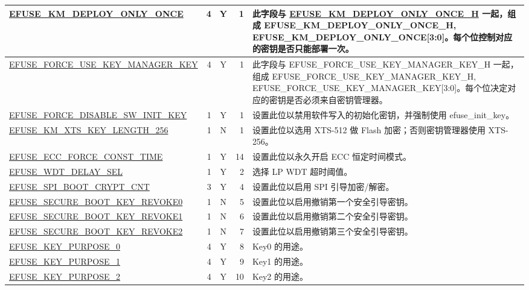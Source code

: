 \begin{longtable}[l]{ |m{8.2cm}|r|c|r|m{9cm}| }
    \hyperref[fielddesc:EFUSEKMDEPLOYONLYONCE]{EFUSE\_KM\_DEPLOY\_ONLY\_ONCE} & 4 & Y & 1 & 此字段与 \hyperref[fielddesc:EFUSEKMDEPLOYONLYONCEH]{EFUSE\_KM\_DEPLOY\_ONLY\_ONCE\_H} 一起，组成 {EFUSE\_\-KM\_\-DEPLOY\_\-ONLY\_\-ONCE\_\-H, EFUSE\_\-KM\_\-DEPLOY\_\-ONLY\_\-ONCE[3:0]}。每个位控制对应的密钥是否只能部署一次。\\ \hline
    \hyperref[fielddesc:EFUSEFORCEUSEKEYMANAGERKEY]{EFUSE\_FORCE\_USE\_KEY\_MANAGER\_KEY} & 4 & Y & 1 & 此字段与 EFUSE\_FORCE\_USE\_KEY\_MANAGER\_KEY\_H 一起，组成 {EFUSE\_\-FORCE\_\-USE\_\-KEY\_\-MANAGER\_\-KEY\_\-H, EFUSE\_\-FORCE\_\-USE\_\-KEY\_\-MANAGER\_\-KEY[3:0]}。每个位决定对应的密钥是否必须来自密钥管理器。 \\ \hline
    \hyperref[fielddesc:EFUSEFORCEDISABLESWINITKEY]{EFUSE\_FORCE\_DISABLE\_SW\_INIT\_KEY} & 1 & Y & 1 & 设置此位以禁用软件写入的初始化密钥，并强制使用 efuse\_init\_key。 \\ \hline
    \hyperref[fielddesc:EFUSEKMXTSKEYLENGTH256]{EFUSE\_KM\_XTS\_KEY\_LENGTH\_256} & 1 & N & 1 & 设置此位以选用 XTS-512 做 Flash 加密；否则密钥管理器使用 XTS-256。 \\ \hline
    \hyperref[fielddesc:EFUSEECCFORCECONSTTIME]{EFUSE\_ECC\_FORCE\_CONST\_TIME} & 1 & Y & 14 & 设置此位以永久开启 ECC 恒定时间模式。 \\ \hline
    \hyperref[fielddesc:EFUSEWDTDELAYSEL]{EFUSE\_WDT\_DELAY\_SEL} & 1 & Y & 2 & 选择 LP WDT 超时阈值。 \\ \hline
    \hyperref[fielddesc:EFUSESPIBOOTCRYPTCNT]{EFUSE\_SPI\_BOOT\_CRYPT\_CNT} & 3 & Y & 4 & 设置此位以启用 SPI 引导加密/解密。 \\ \hline
    \hyperref[fielddesc:EFUSESECUREBOOTKEYREVOKE0]{EFUSE\_SECURE\_BOOT\_KEY\_REVOKE0} & 1 & N & 5 & 设置此位以启用撤销第一个安全引导密钥。 \\ \hline
    \hyperref[fielddesc:EFUSESECUREBOOTKEYREVOKE1]{EFUSE\_SECURE\_BOOT\_KEY\_REVOKE1} & 1 & N & 6 & 设置此位以启用撤销第二个安全引导密钥。 \\ \hline
    \hyperref[fielddesc:EFUSESECUREBOOTKEYREVOKE2]{EFUSE\_SECURE\_BOOT\_KEY\_REVOKE2} & 1 & N & 7 & 设置此位以启用撤销第三个安全引导密钥。 \\ \hline
    \hyperref[fielddesc:EFUSEKEYPURPOSE0]{EFUSE\_KEY\_PURPOSE\_0} & 4 & Y & 8 & Key0 的用途。 \\ \hline
    \hyperref[fielddesc:EFUSEKEYPURPOSE1]{EFUSE\_KEY\_PURPOSE\_1} & 4 & Y & 9 & Key1 的用途。 \\ \hline
    \hyperref[fielddesc:EFUSEKEYPURPOSE2]{EFUSE\_KEY\_PURPOSE\_2} & 4 & Y & 10 & Key2 的用途。 \\ \hline

\end{longtable}
